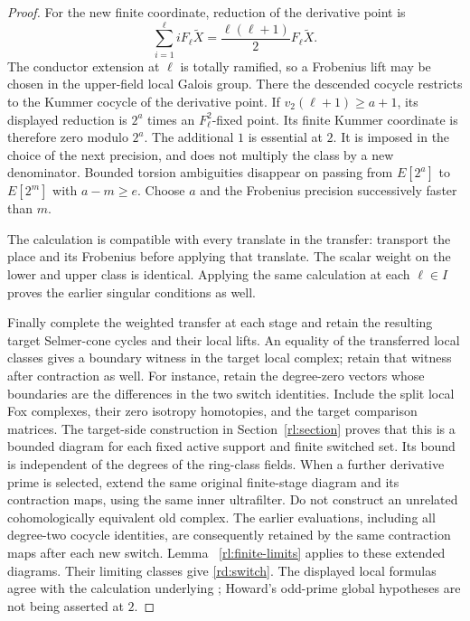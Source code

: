 \begin{proof}
For the new finite coordinate, reduction of the derivative point is
\begin{equation}
 \sum_{i=1}^{\ell}iF_\ell\widetilde X
       =\frac{\ell(\ell+1)}2F_\ell\widetilde X.
 \label{rd:half-factor}
\end{equation}
The conductor extension at \(\ell\) is totally ramified, so a
Frobenius lift may be chosen in the upper-field local Galois group.
There the descended cocycle restricts to the Kummer cocycle of the
derivative point.  If \(v_2(\ell+1)\ge a+1\), its displayed
reduction is \(2^a\) times an \(F_\ell^2\)-fixed point.
Its finite Kummer coordinate is therefore zero modulo \(2^a\).
The additional \(1\) is essential at
\(2\).  It is imposed in the choice of the next precision, and does
not multiply the class by a new denominator.  Bounded torsion
ambiguities disappear on passing from \(E[2^a]\) to \(E[2^m]\) with
\(a-m\ge e\).  Choose \(a\) and the Frobenius precision successively
faster than \(m\).

The calculation is compatible with every translate in the transfer:
transport the place and its Frobenius before applying that translate.
The scalar weight on the lower and upper class is identical.  Applying
the same calculation at each \(\ell\in I\) proves the earlier
singular conditions as well.

Finally complete the weighted transfer at each stage and retain the
resulting target Selmer-cone cycles and their local lifts.  An equality
of the transferred local classes gives a boundary witness in the
target local complex; retain that witness after contraction as well.
For instance, retain the degree-zero vectors whose boundaries are the
differences in the two switch identities.  Include the split local Fox
complexes, their zero isotropy homotopies, and the target comparison
matrices.  The target-side construction in Section~\ref{rl:section} proves
that this is a bounded diagram for each fixed active support and
finite switched set.  Its bound is independent of the degrees of
the ring-class fields.
When a further derivative prime is selected, extend the
same original finite-stage diagram and its contraction
maps, using the same inner ultrafilter.  Do not construct
an unrelated cohomologically equivalent old complex.
The earlier evaluations, including all degree-two
cocycle identities, are consequently retained by the
same contraction maps after each new switch.  Lemma~
\ref{rl:finite-limits} applies to these extended diagrams.
Their limiting classes give
\eqref{rd:switch}.  The displayed local formulas agree with the
calculation underlying \cite[Proposition~1.7.4]{Howard2012}; Howard's
odd-prime global hypotheses are not being asserted at \(2\).
\end{proof}

